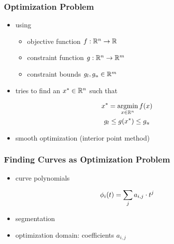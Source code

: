 \documentclass[mathserif]{beamer}
\begin{document}
		\begin{frame}
			\frametitle{Optimization Problem}
			\begin{itemize}
				\item using
				\begin{itemize}
					\item objective function \(f : \mathbb{R}^{n} \rightarrow \mathbb{R}\)
					\item constraint function \(g : \mathbb{R}^{n} \rightarrow \mathbb{R}^{m}\)
					\item constraint bounds \(g_l, g_u \in \mathbb{R}^{m}\)
				\end{itemize} 
				\item tries to find an \(x^* \in \mathbb{R}^{n}\) such that 
			\end{itemize}
			\begin{equation*}
				\begin{gathered}
					x^* = \operatorname*{argmin}_{x \in \mathbb{R}^{n}} f\!\left( x \right)\\
					g_l \leq g\!\left( x^* \right) \leq g_u
				\end{gathered}
			\end{equation*}
			\begin{itemize}
				\item smooth optimization (interior point method)
			\end{itemize}
		\end{frame}

		\begin{frame}
			\frametitle{Finding Curves as Optimization Problem}
			\begin{itemize}
				\item curve polynomials
			\end{itemize}
			\begin{equation*}
				\phi_i\!\left( t \right) = \sum_j a_{i,j} \cdot t^j
			\end{equation*}
			\begin{itemize}
				\item segmentation
			\end{itemize}
			\begin{itemize}
				\item optimization domain: coefficients \(a_{i,j}\)
			\end{itemize}
		\end{frame}
\end{document}
